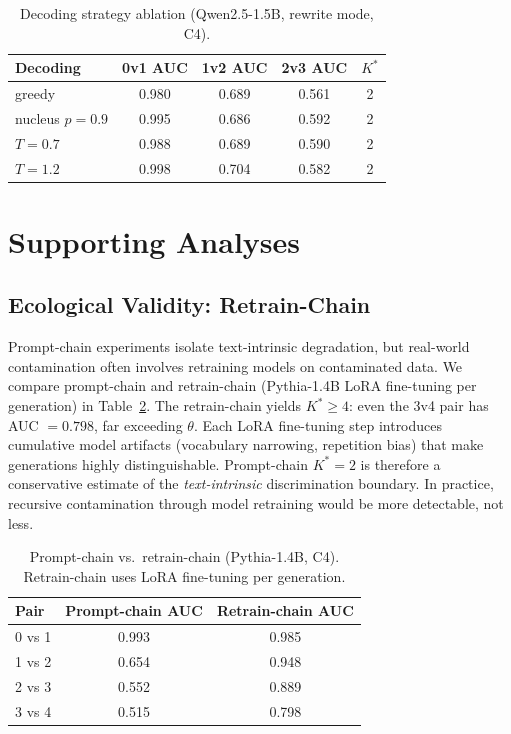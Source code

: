 \documentclass[11pt]{article}
\begin{document}
\begin{table}[t]
\centering
\caption{Decoding strategy ablation (Qwen2.5-1.5B, rewrite mode, C4).}
\label{tab:decoding}
\small
\begin{tabular}{lcccc}
\toprule
Decoding & 0v1 AUC & 1v2 AUC & 2v3 AUC & $K^*$ \\
\midrule
greedy & 0.980 & 0.689 & 0.561 & 2 \\
nucleus $p{=}0.9$ & 0.995 & 0.686 & 0.592 & 2 \\
$T{=}0.7$ & 0.988 & 0.689 & 0.590 & 2 \\
$T{=}1.2$ & 0.998 & 0.704 & 0.582 & 2 \\
\bottomrule
\end{tabular}
\end{table}

\section{Supporting Analyses}
\label{sec:analysis}

\subsection{Ecological Validity: Retrain-Chain}

Prompt-chain experiments isolate text-intrinsic degradation, but real-world contamination often involves retraining models on contaminated data. We compare prompt-chain and retrain-chain (Pythia-1.4B LoRA fine-tuning per generation) in Table~\ref{tab:retrain}. The retrain-chain yields $K^* \geq 4$: even the 3v4 pair has AUC $= 0.798$, far exceeding $\theta$. Each LoRA fine-tuning step introduces cumulative model artifacts (vocabulary narrowing, repetition bias) that make generations highly distinguishable. Prompt-chain $K^* = 2$ is therefore a conservative estimate of the \emph{text-intrinsic} discrimination boundary. In practice, recursive contamination through model retraining would be more detectable, not less.

\begin{table}[t]
\centering
\caption{Prompt-chain vs.\ retrain-chain (Pythia-1.4B, C4). Retrain-chain uses LoRA fine-tuning per generation.}
\label{tab:retrain}
\small
\begin{tabular}{lcc}
\toprule
Pair & Prompt-chain AUC & Retrain-chain AUC \\
\midrule
0 vs 1 & 0.993 & 0.985 \\
1 vs 2 & 0.654 & 0.948 \\
2 vs 3 & 0.552 & 0.889 \\
3 vs 4 & 0.515 & 0.798 \\
\bottomrule
\end{tabular}
\end{table}
\end{document}
